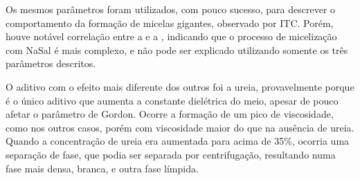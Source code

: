 		Os mesmos parâmetros foram utilizados, com pouco sucesso, para descrever o comportamento da formação de micelas gigantes, observado por ITC. Porém, houve notável correlação entre a \cmc{} e a \DHmic{}, indicando que o processo de micelização com NaSal é mais complexo, e não pode ser explicado utilizando somente os três parâmetros descritos.
		
		O aditivo com o efeito mais diferente dos outros foi a ureia, provavelmente porque é o único aditivo que aumenta a constante dielétrica do meio, apesar de pouco afetar o parâmetro de Gordon. Ocorre a formação de um pico de viscosidade, como nos outros casos, porém com viscosidade maior do que na ausência de ureia. Quando a concentração de ureia era aumentada para acima de 35\%, ocorria uma separação de fase, que podia ser separada por centrifugação, resultando numa fase mais densa, branca, e outra fase límpida.
		
%		
%		
		
\FloatBarrier
